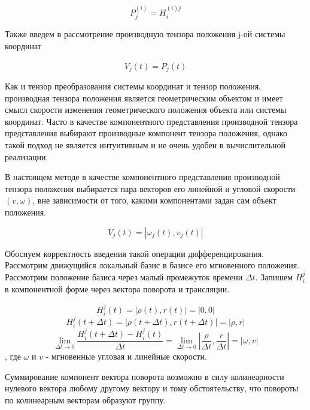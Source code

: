 \begin{equation}
P_j^{(i)} = H_{i}^{(i)j}
\end{equation}

Также введем в рассмотрение производную тензора положения j-ой системы координат

\begin{equation}\label{speed_eq} 
V_j(t) = \dot{P}_j(t) 
\end{equation}

Как и тензор преобразования системы координат и тензор положения, производная тензора положения является геометрическим объектом и имеет смысл скорости изменения геометрического положения объекта или системы координат. Часто в качестве компонентного представления производной тензора представления выбирают производные компонент тензора положения, однако такой подход не является интуитивным и не очень удобен в вычислительной реализации.

В настоящем методе в качестве компонентного представления производной тензора положения выбирается пара векторов его линейной и угловой скорости $(v,\omega)$, вне зависимости от того, какими компонентами задан сам объект положения.

\begin{equation}\label{speed_eq_comp} 
V_j(t) = |\omega_j(t),v_j(t)|
\end{equation} 

Обоснуем корректность введения такой операции дифференцирования. Рассмотрим движущийся локальный базис в базисе его мгновенного положения. Рассмотрим положение базиса через малый промежуток времени $\Delta t$. Запишем $H^j_i$ в компонентной форме через вектора поворота и трансляции.

\begin{equation}H^j_i(t) = |\rho(t), r(t)| = |0, 0|\end{equation} 
\begin{equation}H^j_i(t+\Delta t) = |\rho(t + \Delta t), r(t + \Delta t)| = |\rho, r|\end{equation} 
\begin{equation}\lim_{\Delta t \to 0}\frac{H^j_i(t+\Delta t) - H^j_i(t)}{\Delta t} = \lim_{\Delta t \to 0}|\frac{\rho}{\Delta t}, \frac{r}{\Delta t}| = |\omega, v|\end{equation} , где $\omega$ и $v$ - мгновенные угловая и линейные скорости.

Суммирование компонент вектора поворота возможно в силу колинеарности нулевого вектора любому другому вектору и тому обстоятельству, что повороты по колинеарным векторам образуют группу.

